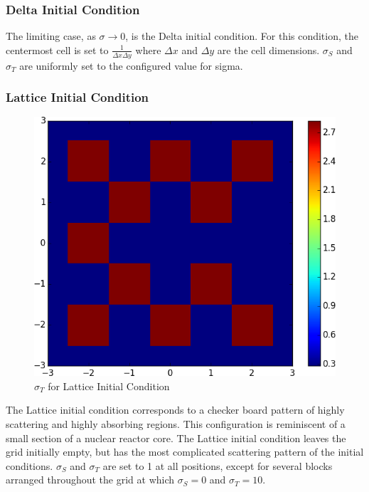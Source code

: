 \documentclass{article}
\begin{document}
\subsubsection{Delta Initial Condition}
The limiting case, as $\sigma \to 0$, is the
Delta initial condition. For this condition, the centermost cell is set to
$\frac{1}{\Delta x \Delta y}$ where $\Delta x$ and $\Delta y$ are the cell
dimensions. $\sigma_S$ and $\sigma_T$ are uniformly set to the configured
value for sigma.

\subsubsection{Lattice Initial Condition}
\begin{figure}
    \centering
    \includegraphics[height=0.3\textheight]{initcond_lattice-t.png}
    \caption{$\sigma_T$ for Lattice Initial Condition}
\end{figure}
The Lattice initial condition corresponds to a checker board pattern
of highly scattering and highly absorbing regions. This configuration is reminiscent of a
small section of a nuclear reactor core. The Lattice initial condition leaves the
grid initially empty, but has the most complicated scattering pattern of the initial
conditions. $\sigma_S$ and $\sigma_T$ are set to 1 at all positions, except
for several blocks arranged throughout the grid at which $\sigma_S=0$ and
$\sigma_T=10$.
\end{document}
